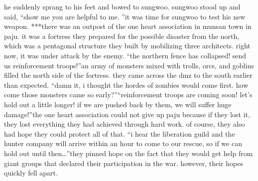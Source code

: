 he suddenly sprang to his feet and bowed to sungwoo.
sungwoo stood up and said, “show me you are helpful to me.
”it was time for sungwoo to test his new weapon.
***there was an outpost of the one heart association in munsan town in paju.
it was a fortress they prepared for the possible disaster from the north, which was a pentagonal structure they built by mobilizing three architects.
right now, it was under attack by the enemy.
“the northern fence has collapsed! send us reinforcement troops!”an army of monsters mixed with trolls, orcs, and goblins filled the north side of the fortress.
they came across the dmz to the south earlier than expected.
“damn it, i thought the hordes of zombies would come first.
 how come those monsters came so early?”“reinforcement troops are coming soon! let’s hold out a little longer! if we are pushed back by them, we will suffer huge damage!”the one heart association could not give up paju because if they lost it, they lost everything they had achieved through hard work.
of course, they also had hope they could protect all of that.
“i hear the liberation guild and the hunter company will arrive within an hour to come to our rescue, so if we can hold out until then…”they pinned hope on the fact that they would get help from giant groups that declared their participation in the war.
 however, their hopes quickly fell apart.


 